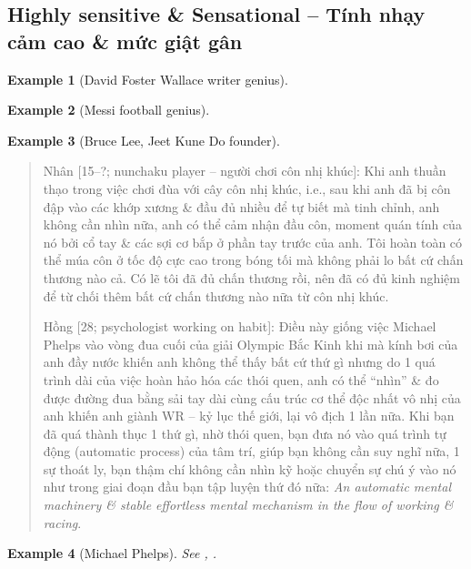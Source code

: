 \documentclass[12pt,twoside]{book}
\newtheorem{example}{Example}
\begin{document}
\subsection{Highly sensitive \& Sensational -- Tính nhạy cảm cao \& mức giật gân}

\begin{example}[{\sc David Foster Wallace} writer genius]
	
\end{example}

\begin{example}[{\sc Messi} football genius]
	
\end{example}

\begin{example}[{\sc Bruce Lee}, Jeet Kune Do founder]
	
\end{example}

\begin{quote}
	{\sf Nhân [15--?; nunchaku player -- người chơi côn nhị khúc]}: Khi anh thuần thạo trong việc chơi đùa với cây côn nhị khúc, i.e., sau khi anh đã bị côn đập vào các khớp xương \& đầu đủ nhiều để tự biết mà tinh chỉnh, anh không cần nhìn nữa, anh có thể cảm nhận đầu côn, moment quán tính của nó bởi cổ tay \& các sợi cơ bắp ở phần tay trước của anh. Tôi hoàn toàn có thể múa côn ở tốc độ cực cao trong bóng tối mà không phải lo bất cứ chấn thương nào cả. Có lẽ tôi đã đủ chấn thương rồi, nên đã có đủ kinh nghiệm để từ chối thêm bất cứ chấn thương nào nữa từ côn nhị khúc.
	
	{\sf Hồng [28; psychologist working on habit]}: Điều này giống việc {\sc Michael Phelps} vào vòng đua cuối của giải Olympic Bắc Kinh khi mà kính bơi của anh đầy nước khiến anh không thể thấy bất cứ thứ gì nhưng do 1 quá trình dài của việc hoàn hảo hóa các thói quen, anh có thể ``nhìn'' \& đo được đường đua bằng sải tay dài cùng cấu trúc cơ thể độc nhất vô nhị của anh khiến anh giành WR -- kỷ lục thế giới, lại vô địch 1 lần nữa. Khi bạn đã quá thành thục 1 thứ gì, nhờ thói quen, bạn đưa nó vào quá trình tự động (automatic process) của tâm trí, giúp bạn không cần suy nghĩ nữa, 1 sự thoát ly, bạn thậm chí không cần nhìn kỹ hoặc chuyển sự chú ý vào nó như trong giai đoạn đầu bạn tập luyện thứ đó nữa: {\it An automatic mental machinery \& stable effortless mental mechanism in the flow of working \& racing}.
\end{quote}

\begin{example}[{\sc Michael Phelps}]
	See {\rm\cite{Duhigg_habit}, \cite[pp. 176--184]{Duhigg_habit_VN}}.
\end{example}
\end{document}
